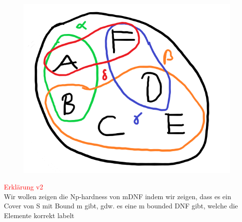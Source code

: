 \documentclass[12pt,a4paper]{article}
\newcommand{\red}[1]{\textcolor{red} {#1}}
\begin{document}
\begin{figure}[H]
\centering
\includegraphics[scale=0.5]{./resources/set-cover.png}
\end{figure}
\red{Erklärung v2}\\
Wir wollen zeigen die Np-hardness von mDNF indem wir zeigen, dass es ein Cover von S mit Bound m gibt, gdw. es eine m bounded DNF gibt, welche die Elemente korrekt labelt
\end{document}
